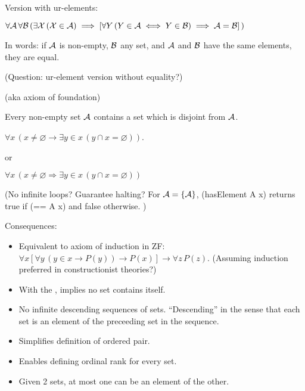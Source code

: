 Version with ur-elements:

$\forall \mathcal{A}\,
\forall \mathcal{B}\,
(\exists \mathcal{X}\,(\mathcal{X}\in \mathcal{A})
\implies
 [\forall Y\,
 (Y\in \mathcal{A}
 \iff 
 Y\in \mathcal{B}) \implies \mathcal{A}=\mathcal{B}]\,)$
 
In words: 
if $\mathcal{\mathcal{A}}$ is non-empty, $\mathcal{B}$ any set, 
and $\mathcal{\mathcal{A}}$ and $\mathcal{B}$ have the same
elements, they are equal.

(Question: ur-element version without equality?)


(aka axiom of foundation)~\cite{wiki:AxiomOfRegularity}

Every non-empty set $\mathcal{A}$ contains a set which is disjoint from $\mathcal{A}$.

$\forall x\,(x \neq \varnothing
\rightarrow 
\exists y\in x\,(y\cap x=\varnothing ))$.
 
or
 
$\forall x\,(x\neq \varnothing \Rightarrow 
 \exists y\in x\,(y\cap x=\varnothing ))$
 
(No infinite loops? Guarantee halting? 
For $\mathcal{A} = \{\mathcal{A}\}$,
\textsf{(hasElement A x)} 
returns \textsf{true} if \textsf{(== A x)}
and \textsf{false} otherwise. )

Consequences:
\begin{itemize}
\item 
Equivalent to axiom of induction\cite{wiki:EpsilonInduction} 
in \textsf{ZF}:
$\forall x
[\forall y\,(y\in x\rightarrow P(y))\rightarrow P(x)]
\rightarrow \forall z\,P(z)$.
(Assuming induction preferred in constructionist theories?)

\item With the , 
implies no set contains itself.

\item No infinite descending sequences of sets.
``Descending'' in the sense that each set is an element of the
preceeding set in the sequence.

\item Simplifies definition of ordered pair.

\item Enables defining ordinal rank for every set.

\item Given 2 sets, at most one can be an element of the other.
\end{itemize}

